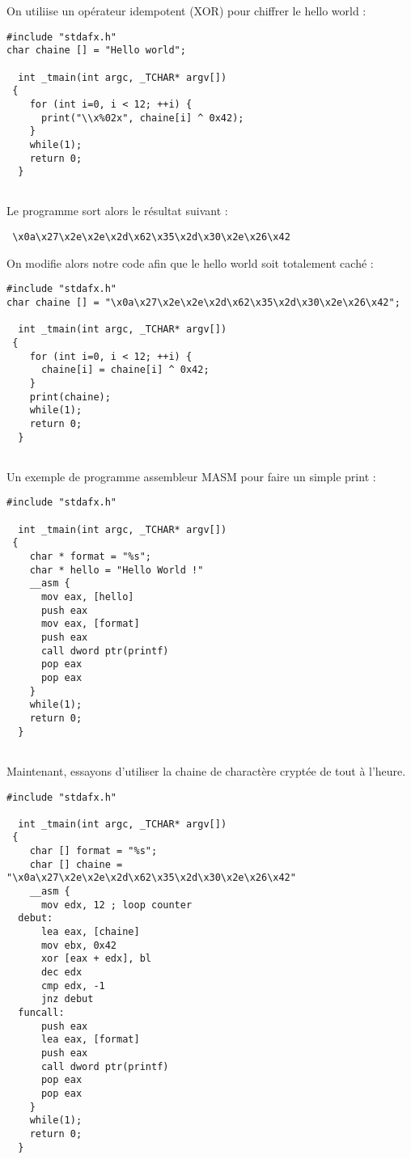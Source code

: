 \documentclass[a4paper,10pt]{article}
\begin{document}
On utiliise un opérateur idempotent (XOR) pour chiffrer le hello world : 

\begin{lstlisting}
#include "stdafx.h"
char chaine [] = "Hello world";

  int _tmain(int argc, _TCHAR* argv[])
 {
    for (int i=0, i < 12; ++i) {
      print("\\x%02x", chaine[i] ^ 0x42);
    }
    while(1);
    return 0;
  }
 
\end{lstlisting}

Le programme sort alors le résultat suivant : 
\begin{lstlisting}
 \x0a\x27\x2e\x2e\x2d\x62\x35\x2d\x30\x2e\x26\x42
\end{lstlisting}

On modifie alors notre code afin que le hello world soit totalement caché : 

\begin{lstlisting}
#include "stdafx.h"
char chaine [] = "\x0a\x27\x2e\x2e\x2d\x62\x35\x2d\x30\x2e\x26\x42";

  int _tmain(int argc, _TCHAR* argv[])
 {
    for (int i=0, i < 12; ++i) {
	  chaine[i] = chaine[i] ^ 0x42;
	}    
    print(chaine);
    while(1);
    return 0;
  }
 
\end{lstlisting}

Un exemple de programme assembleur MASM pour faire un simple print : 

\begin{lstlisting}
#include "stdafx.h"

  int _tmain(int argc, _TCHAR* argv[])
 {
    char * format = "%s";
    char * hello = "Hello World !"
    __asm {
      mov eax, [hello]
      push eax
      mov eax, [format]
      push eax
      call dword ptr(printf)
      pop eax
      pop eax
    }
    while(1);
    return 0;
  }
 
\end{lstlisting}

Maintenant, essayons d'utiliser la chaine de charactère cryptée de tout à l'heure.	


\begin{lstlisting}
#include "stdafx.h"

  int _tmain(int argc, _TCHAR* argv[])
 {
    char [] format = "%s";
    char [] chaine = "\x0a\x27\x2e\x2e\x2d\x62\x35\x2d\x30\x2e\x26\x42"
    __asm {
      mov edx, 12 ; loop counter
  debut: 
      lea eax, [chaine]
      mov ebx, 0x42
      xor [eax + edx], bl
      dec edx
      cmp edx, -1
      jnz debut
  funcall:
      push eax
      lea eax, [format]
      push eax
      call dword ptr(printf)
      pop eax
      pop eax
    }
    while(1);
    return 0;
  }
 
\end{lstlisting}
\end{document}
